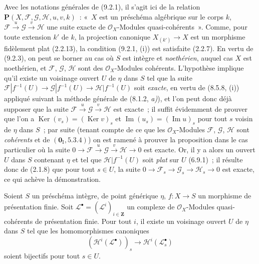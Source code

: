 Avec les notations générales de (9.2.1), il s'agit ici de la relation
$\boldsymbol{P}(X,\mathcal F,\mathcal G,\mathcal H,u,v,k)$~: «~$X$ est un
préschéma algébrique sur le corps $k$,
$\mathcal F\xrightarrow{u}\mathcal G\xrightarrow{v}\mathcal H$ une suite
exacte de $\mathcal O_X$-Modules quasi-cohérents~». Comme, pour toute extension
$k'$ de $k$, la projection canonique $X_{(k')}\to X$ est un morphisme
fidèlement plat (2.2.13), la condition (9.2.1, (i)) est satisfaite (2.2.7). En
vertu de (9.2.3), on peut se borner au cas où $S$ est intègre et
\emph{noethérien}, auquel cas $X$ est noethérien, et $\mathcal F$,
$\mathcal G$, $\mathcal H$ sont des $\mathcal O_X$-Modules cohérents.
L'hypothèse implique qu'il existe un voisinage ouvert $U$ de $\eta$ dans $S$
tel que la suite
$\mathcal F|f^{-1}(U)\to\mathcal G|f^{-1}(U)\to\mathcal H|f^{-1}(U)$ soit
\emph{exacte}, en vertu de (8.5.8, (i)) appliqué suivant la méthode générale
de (8.1.2, \emph{a)}), et l'on peut donc déjà supposer que la suite
$\mathcal F\xrightarrow{u}\mathcal G\xrightarrow{v}\mathcal H$ est exacte~;
il suffit évidemment de prouver que l'on a
$\operatorname{Ker}(v_s)=(\operatorname{Ker}v)_s$ et
$\operatorname{Im}(u_s)=(\operatorname{Im}u)_s$ pour tout $s$ voisin de
$\eta$ dans $S$~; par suite (tenant compte de ce que les
$\mathcal O_X$-Modules $\mathcal F$, $\mathcal G$, $\mathcal H$ sont
\emph{cohérents} et de $(\mathbf 0_{\mathrm I},5.3.4)$) on est ramené à
prouver la proposition dans le cas particulier où la suite
$0\to\mathcal F\xrightarrow{u}\mathcal G\xrightarrow{v}\mathcal H\to0$
est exacte. Or, il y a alors un ouvert $U$ dans $S$ contenant $\eta$ et tel
que $\mathcal H|f^{-1}(U)$ soit \emph{plat} sur $U$ (6.9.1)~; il résulte donc
de (2.1.8) que pour tout $s\in U$, la suite
$0\to\mathcal F_s\to\mathcal G_s\to\mathcal H_s\to0$ est exacte, ce qui
achève la démonstration.

\begin{corollary}[9.4.3]
\label{IV.9.4.3-fr}
Soient $S$ un préschéma intègre, de point générique $\eta$, $f:X\to S$ un
morphisme de présentation finie. Soit
$\mathcal L^\bullet=(\mathcal L^i)_{i\in\mathbf Z}$ un complexe de
$\mathcal O_X$-Modules quasi-cohérents de présentation finie. Pour tout $i$,
il existe un voisinage ouvert $U$ de $\eta$ dans $S$ tel que les homomorphismes
canoniques
\begin{equation}
\label{IV.9.4.3.1-fr}
(\mathcal H^i(\mathcal L^\bullet))_s\to
\mathcal H^i(\mathcal L_s^\bullet) \tag{9.4.3.1}
\end{equation}
soient bijectifs pour tout $s\in U$.
\end{corollary}

